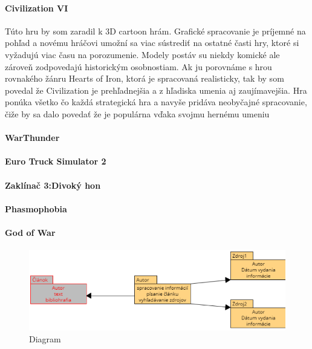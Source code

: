 \documentclass[10pt,twoside,slovak,a4paper]{article}
\begin{document}
\paragraph{Civilization VI}
Túto hru by som zaradil k 3D cartoon hrám. Grafické spracovanie je príjemné na pohľad a novému hráčovi umožní sa viac sústrediť na ostatné časti hry, ktoré si vyžadujú viac času na porozumenie. Modely postáv su niekdy komické ale zároveň zodpovedajú historickým osobnostiam. Ak ju porovnáme s hrou rovnakého žánru Hearts of Iron, ktorá je spracovaná realisticky, tak by som povedal že Civilization je prehľadnejšia a z hľadiska umenia aj zaujímavejšia. Hra ponúka všetko čo každá strategická hra a navyše pridáva neobyčajné spracovanie, čiže by sa dalo povedať že je populárna vďaka svojmu hernému umeniu

\paragraph{WarThunder}

\paragraph{Euro Truck Simulator 2}

\paragraph{Zaklínač 3:Divoký hon}

\paragraph{Phasmophobia}

\paragraph{God of War}
























\begin{figure}[!ht]
\begin{center}
\includegraphics[width=12cm]{diagram novy.png}
\caption{Diagram}
\end{center}
\end{figure}
\end{document}
